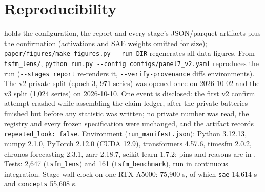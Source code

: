 \section{Reproducibility}
\label{app:repro}

 holds the configuration, the report and every stage's JSON/parquet artifacts plus the
confirmation (activations and SAE weights omitted for size); \texttt{paper/figures/make\_figures.py -{}-run DIR}
regenerates all data figures. From \texttt{tsfm\_lens/}, \texttt{python run.py -{}-config configs/panel7\_v2.yaml}
reproduces the run (\texttt{-{}-stages report} re-renders it, \texttt{-{}-verify-provenance} diffs environments). The v2
private split (epoch 3, 971 series) was opened once on 2026-10-02 and the v3 split (1{,}024 series) on 2026-10-10. One
event is disclosed: the first v2 confirm attempt crashed while assembling the claim ledger, after the private batteries
finished but before any statistic was written; no private number was read, the registry and every frozen specification
were unchanged, and the artifact records \texttt{repeated\_look: false}. Environment (\texttt{run\_manifest.json}):
Python 3.12.13, numpy 2.1.0, PyTorch 2.12.0 (CUDA 12.9), transformers 4.57.6, timesfm 2.0.2, chronos-forecasting 2.3.1,
zarr 2.18.7, scikit-learn 1.7.2; pins and reasons are in . Tests: 2{,}647 (\texttt{tsfm\_lens}) and
161 (\texttt{tsfm\_benchmark}), run in continuous integration. Stage wall-clock on one RTX A5000: 75{,}900 s, of which
\texttt{sae} 14{,}614 s and \texttt{concepts} 55{,}608 s.


